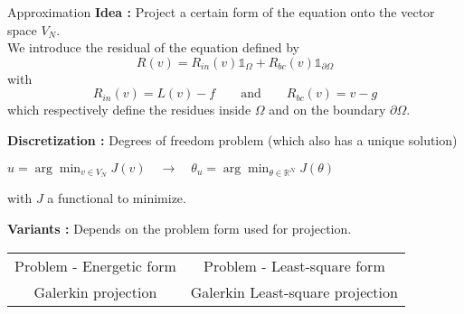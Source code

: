\begin{frame}{Approximation}
	\textbf{Idea :} Project a certain form of the equation onto the vector space $V_N$. \\
	We introduce the residual of the equation defined by
	\begin{equation*}
		R(v) = R_{in}(v)\mathds{1}_{\Omega} + R_{bc}(v)\mathds{1}_{\partial \Omega}
	\end{equation*}
	with 
	\begin{equation*}
		R_{in}(v)=L(v) - f \qquad \text{and} \qquad R_{bc}(v)=v-g
	\end{equation*}
	which respectively define the residues inside $\Omega$ and on the boundary $\partial\Omega$. 
	
	\vspace{10pt}
	
	\textbf{Discretization :} Degrees of freedom problem (which also has a unique solution)
	\begin{center}
		$u=\arg\min_{v\in V_N} J(v) \quad \longrightarrow \quad \theta_u=\arg\min_{\theta\in \mathbb{R}^N} J(\theta) $
	\end{center}
	with $J$ a functional to minimize.
	
	\vspace{10pt}
	
	\textbf{Variants :} Depends on the problem form used for projection.
	
	\begin{center}
		\begin{tabular}{c|c}
			Problem - Energetic form & Problem - Least-square form \\
			Galerkin projection & Galerkin Least-square projection
		\end{tabular}
	\end{center}
\end{frame}

